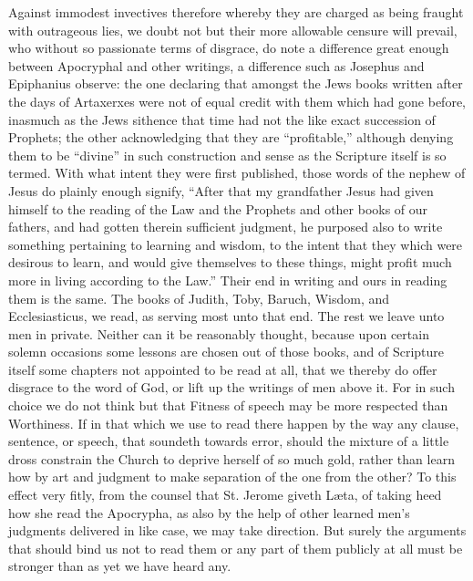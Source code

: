 Against immodest invectives therefore whereby they are charged as being fraught with outrageous lies, we doubt not but their more allowable censure will prevail, who without so passionate terms of disgrace, do note a difference great enough between Apocryphal and other writings, a difference such as Josephus and Epiphanius observe: the one declaring that amongst the Jews books written after the days of Artaxerxes were not of equal credit with them which had gone before, inasmuch as the Jews sithence that time had not the like exact succession of Prophets; the other acknowledging that  they are “profitable,” although denying them to be “divine” in such construction and sense as the Scripture itself is so termed. With what intent they were first published, those words of the nephew of Jesus do plainly enough signify, “After that my grandfather Jesus had given himself to the reading of the Law and the Prophets and other books of our fathers, and had gotten therein sufficient judgment, he purposed also to write something pertaining to learning and wisdom, to the intent that they which were desirous to learn, and would give themselves to these things, might profit much more in living according to the Law.” Their end in writing and ours in reading them is the same. The books of Judith, Toby, Baruch, Wisdom, and Ecclesiasticus, we read, as serving most unto that end. The rest we leave unto men in private.
Neither can it be reasonably thought, because upon certain solemn occasions some lessons are chosen out of those books, and of Scripture itself some chapters not appointed to be read at all, that we thereby do offer disgrace to the word of God, or lift up the writings of men above it. For in such choice we do not think but that Fitness of speech may be more respected than Worthiness. If in that which we use to read there happen by the way any clause, sentence, or speech, that soundeth towards error, should the mixture of a little dross constrain the Church to deprive herself of so much gold, rather than learn how by art and judgment to make separation of the one from the other? To this effect very fitly, from the counsel that St. Jerome giveth Læta, of taking heed how she read the Apocrypha, as also by the help of other learned men’s judgments delivered in like case, we may take direction. But surely the arguments that should bind us not to read them or any part of them publicly at all must be stronger than as yet we have heard any.

